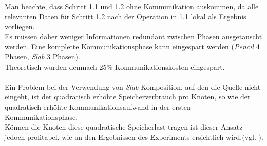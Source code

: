 Man beachte, dass Schritt 1.1 und 1.2 ohne Kommunikation auskommen, da alle relevanten Daten für Schritt 1.2 nach der Operation in 1.1 lokal als Ergebnis vorliegen.\\
Es müssen daher weniger Informationen redundant zwischen Phasen ausgetauscht werden. Eine komplette Kommunikationsphase kann eingespart werden (\textit{Pencil} 4 Phasen, \textit{Slab} 3 Phasen).\\
Theoretisch wurden demnach 25\% Kommunikationskosten eingespart.\\
\\
Ein Problem bei der Verwendung von \textit{Slab}-Komposition, auf den die Quelle \cite{mainpaper} nicht eingeht, ist der quadratisch erhöhte Speicherverbrauch pro Knoten, so wie der quadratisch erhöhte Kommunikationsaufwand in der ersten Kommunikationsphase.\\
Können die Knoten diese quadratische Speicherlast tragen ist dieser Ansatz jedoch profitabel, wie an den Ergebnissen des Experiments ersichtlich wird.(vgl. \cite[Abb. 6]{mainpaper}).

